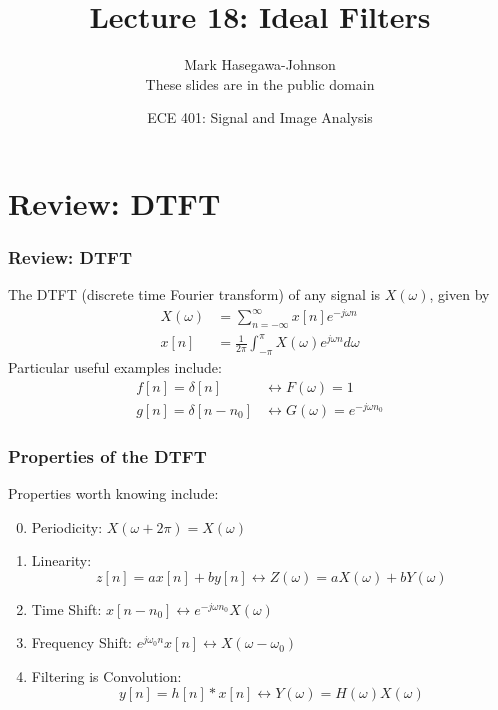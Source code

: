 \documentclass{beamer}
\title{Lecture 18: Ideal Filters}
\author{Mark Hasegawa-Johnson\\These slides are in the public domain}
\date{ECE 401: Signal and Image Analysis}
\begin{document}
\begin{frame}
  \maketitle
\end{frame}

\begin{frame}
  \tableofcontents
\end{frame}

\section[DTFT]{Review: DTFT}
\setcounter{subsection}{1}

\begin{frame}
  \frametitle{Review: DTFT}

  The DTFT (discrete time Fourier transform) of any signal is
  $X(\omega)$, given by
  \begin{align*}
    X(\omega) &= \sum_{n=-\infty}^\infty x[n]e^{-j\omega n}\\
    x[n] &= \frac{1}{2\pi}\int_{-\pi}^\pi X(\omega)e^{j\omega n}d\omega
  \end{align*}
  Particular useful examples include:
  \begin{align*}
    f[n]=\delta[n] &\leftrightarrow F(\omega)=1\\
    g[n]=\delta[n-n_0] &\leftrightarrow G(\omega)=e^{-j\omega n_0}
  \end{align*}
\end{frame}

\begin{frame}
  \frametitle{Properties of the DTFT}

  Properties worth knowing  include:
  \begin{enumerate}
    \setcounter{enumi}{-1}
  \item Periodicity: $X(\omega+2\pi)=X(\omega)$
  \item Linearity:
    \[z[n]=ax[n]+by[n]\leftrightarrow Z(\omega)=aX(\omega)+bY(\omega)
    \]
  \item Time Shift: $x[n-n_0]\leftrightarrow e^{-j\omega n_0}X(\omega)$
  \item Frequency Shift: $e^{j\omega_0 n}x[n]\leftrightarrow X(\omega-\omega_0)$
  \item Filtering is Convolution:
    \[
    y[n]=h[n]\ast x[n]\leftrightarrow Y(\omega)=H(\omega)X(\omega)
    \]
  \end{enumerate}
\end{frame}
\end{document}
